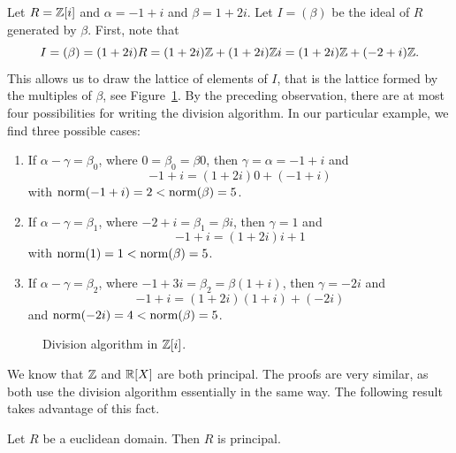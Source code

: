 \begin{example}
	Let $R=\mathbb{Z}[i]$ and 
	$\alpha=-1+i$ and $\beta=1+2i$. Let $I=(\beta)$ be the ideal of $R$ generated by $\beta$. 
	First, note that
	\[
	I=(\beta)=(1+2i)R=(1+2i)\mathbb{Z}+(1+2i)\mathbb{Z} i=(1+2i)\mathbb{Z}+(-2+i)\mathbb{Z}.
	\]  
	This allows us to draw the lattice of elements of $I$, 
	that is the lattice formed by the multiples of $\beta$, see Figure~\ref{fig:Z[i]}. 
	By the preceding observation, there are at most four possibilities for writing
	the division algorithm. 
	In our particular example, we find three possible cases:
	\begin{enumerate}
		\item If $\alpha-\gamma=\beta_0$, where $0=\beta_0=\beta 0$, 
			then $\gamma=\alpha=-1+i$ and 
				\[
				-1+i=(1+2i)0+(-1+i)
				\]
				with $\operatorname{norm}(-1+i)=2<\operatorname{norm}(\beta)=5$. 
		\item If $\alpha-\gamma=\beta_1$, where $-2+i=\beta_1=\beta i$, then 
			$\gamma=1$ and 
			\[
			-1+i=(1+2i)i+1
            \]
			with $\operatorname{norm}(1)=1<\operatorname{norm}(\beta)=5$. 
		\item If $\alpha-\gamma=\beta_2$, where $-1+3i=\beta_2=\beta (1+i)$, 
			then $\gamma=-2i$ and  
			\[
			-1+i=(1+2i)(1+i)+(-2i)
			\]
			and $\operatorname{norm}(-2i)=4<\operatorname{norm}(\beta)=5$. 
	\end{enumerate}
\end{example}

\begin{figure}
\caption{Division algorithm in $\mathbb{Z}[i]$.}
\label{fig:Z[i]}
\end{figure}

We know that $\mathbb{Z}$ and $\mathbb{R}[X]$ are both principal. The proofs 
are very similar, as both use the division algorithm essentially in the same way. 
The following result takes advantage of this fact. 

\begin{proposition}
\label{pro:euclidean=>principal}
	Let $R$ be a euclidean domain. Then $R$ is principal.	
\end{proposition}

